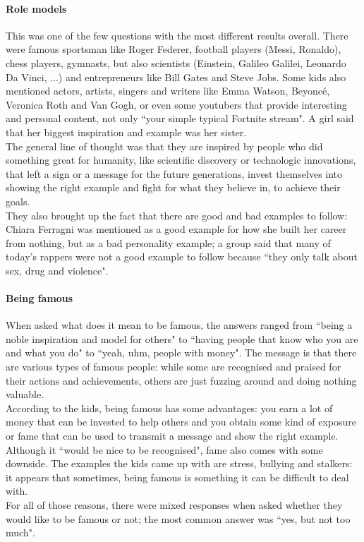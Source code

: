 \documentclass[12pt]{scrartcl}
\begin{document}
		\paragraph{Role models} This was one of the few questions with the most different results overall. There were famous sportsman like Roger Federer, football players (Messi, Ronaldo), chess players, gymnasts, but also scientists (Einstein, Galileo Galilei, Leonardo Da Vinci, ...) and entrepreneurs like Bill Gates and Steve Jobs. Some kids also mentioned actors, artists, singers and writers like Emma Watson, Beyoncé, Veronica Roth and Van Gogh, or even some youtubers that provide interesting and personal content, not only ``your simple typical Fortnite stream". A girl said that her biggest inspiration and example was her sister.\\
		The general line of thought was that they are inspired by people who did something great for humanity, like scientific discovery or technologic innovations, that left a sign or a message for the future generations, invest themselves into showing the right example and fight for what they believe in, to achieve their goals.\\
		They also brought up the fact that there are good and bad examples to follow: Chiara Ferragni was mentioned as a good example for how she built her career from nothing, but as a bad personality example; a group said that many of today's rappers were not a good example to follow because ``they only talk about sex, drug and violence".
		
		\paragraph{Being famous} When asked what does it mean to be famous, the answers ranged from ``being a noble inspiration and model for others" to ``having people that know who you are and what you do" to ``yeah, uhm, people with money". The message is that there are various types of famous people: while some are recognised and praised for their actions and achievements, others are just fuzzing around and doing nothing valuable.\\
		According to the kids, being famous has some advantages: you earn a lot of money that can be invested to help others and you obtain some kind of exposure or fame that can be used to transmit a message and show the right example. Although it ``would be nice to be recognised", fame also comes with some downside. The examples the kids came up with are stress, bullying and stalkers: it appears that sometimes, being famous is something it can be difficult to deal with.\\
		For all of those reasons, there were mixed responses when asked whether they would like to be famous or not; the most common answer was ``yes, but not too much".
		
\end{document}
